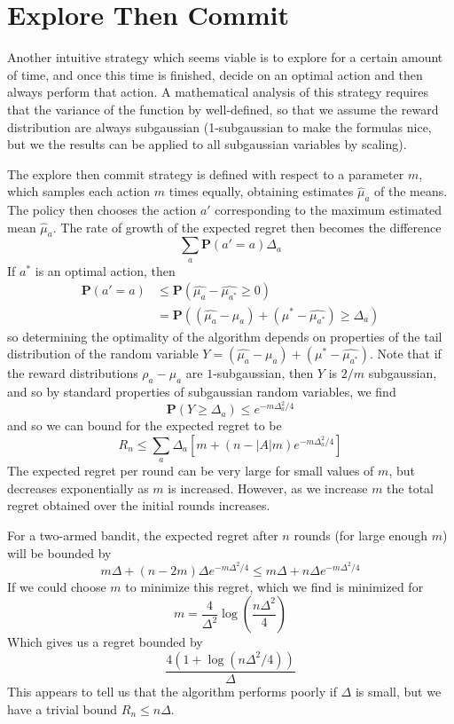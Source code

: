 \section{Explore Then Commit}

Another intuitive strategy which seems viable is to explore for a certain amount of time, and once this time is finished, decide on an optimal action and then always perform that action. A mathematical analysis of this strategy requires that the variance of the function by well-defined, so that we assume the reward distribution are always subgaussian (1-subgaussian to make the formulas nice, but we the results can be applied to all subgaussian variables by scaling).

The explore then commit strategy is defined with respect to a parameter $m$, which samples each action $m$ times equally, obtaining estimates $\widehat{\mu}_a$ of the means. The policy then chooses the action $a'$ corresponding to the maximum estimated mean $\widehat{\mu}_a$. The rate of growth of the expected regret then becomes the difference
%
\[ \sum_a \mathbf{P}(a' = a) \Delta_a \]
%
If $a^*$ is an optimal action, then
%
\begin{align*}
    \mathbf{P}(a' = a) &\leq \mathbf{P}(\widehat{\mu_a} - \widehat{\mu_{a^*}} \geq 0)\\
    &= \mathbf{P}((\widehat{\mu_a} - \mu_a) + (\mu^* - \widehat{\mu_{a^*}}) \geq \Delta_a)
\end{align*}
%
so determining the optimality of the algorithm depends on properties of the tail distribution of the random variable $Y = (\widehat{\mu_a} - \mu_a) + (\mu^* - \widehat{\mu_{a^*}})$. Note that if the reward distributions $\rho_a - \mu_a$ are $1$-subgaussian, then $Y$ is $2/m$ subgaussian, and so by standard properties of subgaussian random variables, we find
%
\[ \mathbf{P}(Y \geq \Delta_a) \leq e^{-m\Delta_a^2/4} \]
%
and so we can bound for the expected regret to be
%
\[ R_n \leq \sum_a \Delta_a \left[ m + (n - |A|m)e^{-m\Delta_a^2/4} \right] \]
%
The expected regret per round can be very large for small values of $m$, but decreases exponentially as $m$ is increased. However, as we increase $m$ the total regret obtained over the initial rounds increases.

For a two-armed bandit, the expected regret after $n$ rounds (for large enough $m$) will be bounded by
%
\[ m \Delta + (n - 2m) \Delta e^{-m \Delta^2/4} \leq m \Delta + n \Delta e^{-m \Delta^2/4} \]
%
If we could choose $m$ to minimize this regret, which we find is minimized for
%
\[ m = \frac{4}{\Delta^2} \log \left(\frac{n \Delta^2}{4} \right) \]
%
Which gives us a regret bounded by
%
\[ \frac{4 (1 + \log(n\Delta^2/4))}{\Delta} \]
%
This appears to tell us that the algorithm performs poorly if $\Delta$ is small, but we have a trivial bound $R_n \leq n \Delta$.

